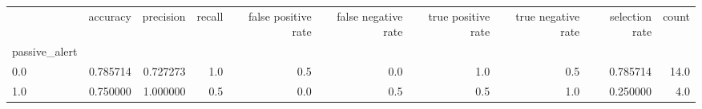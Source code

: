 \begin{tabular}{lrrrrrrrrr}
\toprule
{} &  accuracy &  precision &  recall &  false positive rate &  false negative rate &  true positive rate &  true negative rate &  selection rate &  count \\
passive\_alert &           &            &         &                      &                      &                     &                     &                 &        \\
\midrule
0.0           &  0.785714 &   0.727273 &     1.0 &                  0.5 &                  0.0 &                 1.0 &                 0.5 &        0.785714 &   14.0 \\
1.0           &  0.750000 &   1.000000 &     0.5 &                  0.0 &                  0.5 &                 0.5 &                 1.0 &        0.250000 &    4.0 \\
\bottomrule
\end{tabular}
